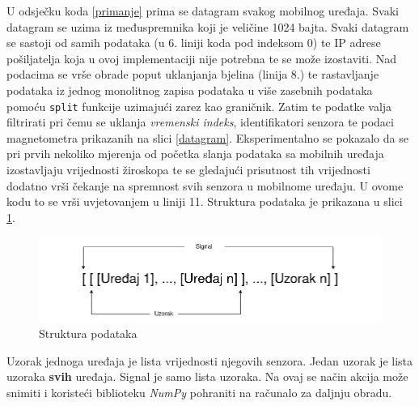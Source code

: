 \documentclass[times, utf8, diplomski]{fer}
\begin{document}
U odsječku koda \ref{primanje} prima se datagram svakog mobilnog uređaja. Svaki datagram se uzima iz međuspremnika koji je veličine 1024 bajta. Svaki datagram se sastoji
od samih podataka (u 6. liniji koda pod indeksom 0) te IP adrese pošiljatelja koja u ovoj implementaciji nije potrebna te se može izostaviti. Nad podacima se vrše obrade
poput uklanjanja bjelina (linija 8.) te rastavljanje podataka iz jednog monolitnog zapisa podataka u više zasebnih podataka pomoću \texttt{split} funkcije uzimajući
zarez kao graničnik. Zatim te podatke valja filtrirati pri čemu se uklanja \textit{vremenski indeks}, identifikatori senzora te podaci magnetometra
prikazanih na slici \ref{datagram}. Eksperimentalno se pokazalo da se pri prvih nekoliko mjerenja od početka slanja podataka sa mobilnih uređaja izostavljaju vrijednosti
žiroskopa te se gledajući prisutnost tih vrijednosti dodatno vrši čekanje na spremnost svih senzora u mobilnome uređaju. U ovome kodu to se vrši uvjetovanjem u liniji 11.
Struktura podataka je prikazana u slici \ref{struktura}.

\begin{figure}[h]
    \includegraphics[width=\textwidth]{OrganizacijaPOdataka.png}
    \caption{Struktura podataka}
    \label{struktura}
\end{figure}

Uzorak jednoga uređaja je lista vrijednosti njegovih senzora. Jedan uzorak je lista uzoraka \textbf{svih} uređaja. Signal je samo lista uzoraka. Na ovaj se način akcija 
može snimiti i koristeći biblioteku \textit{NumPy} pohraniti na računalo za daljnju obradu.
\end{document}
